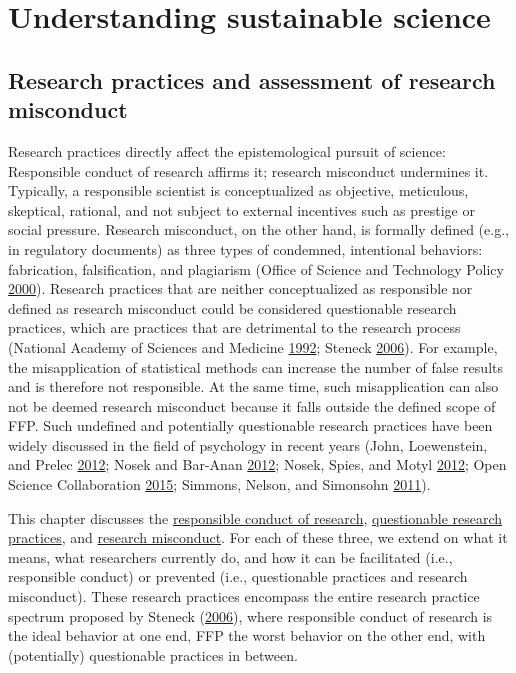 \documentclass[a5paper]{book}
\begin{document}
\part{Understanding sustainable
science}\label{part-understanding-sustainable-science}

\chapter{Research practices and assessment of research
misconduct}\label{research-practices-and-assessment-of-research-misconduct}

Research practices directly affect the epistemological pursuit of
science: Responsible conduct of research affirms it; research misconduct
undermines it. Typically, a responsible scientist is conceptualized as
objective, meticulous, skeptical, rational, and not subject to external
incentives such as prestige or social pressure. Research misconduct, on
the other hand, is formally defined (e.g., in regulatory documents) as
three types of condemned, intentional behaviors: fabrication,
falsification, and plagiarism (Office of Science and Technology Policy
\protect\hyperlink{ref-ostp2000}{2000}). Research practices that are
neither conceptualized as responsible nor defined as research misconduct
could be considered questionable research practices, which are practices
that are detrimental to the research process (National Academy of
Sciences and Medicine
\protect\hyperlink{ref-doi:10.17226ux2f1864}{1992}; Steneck
\protect\hyperlink{ref-doi:10.1007ux2fpl00022268}{2006}). For example,
the misapplication of statistical methods can increase the number of
false results and is therefore not responsible. At the same time, such
misapplication can also not be deemed research misconduct because it
falls outside the defined scope of FFP. Such undefined and potentially
questionable research practices have been widely discussed in the field
of psychology in recent years (John, Loewenstein, and Prelec
\protect\hyperlink{ref-doi:10.1177ux2f0956797611430953}{2012}; Nosek and
Bar-Anan
\protect\hyperlink{ref-doi:10.1080ux2f1047840X.2012.692215}{2012};
Nosek, Spies, and Motyl
\protect\hyperlink{ref-doi:10.1177ux2f1745691612459058}{2012}; Open
Science Collaboration
\protect\hyperlink{ref-doi:10.1126ux2fscience.aac4716}{2015}; Simmons,
Nelson, and Simonsohn
\protect\hyperlink{ref-doi:10.1177ux2f0956797611417632}{2011}).

This chapter discusses the
\protect\hyperlink{responsible-conduct-of-research}{responsible conduct
of research},
\protect\hyperlink{questionable-research-practices}{questionable
research practices}, and
\protect\hyperlink{research-misconduct}{research misconduct}. For each
of these three, we extend on what it means, what researchers currently
do, and how it can be facilitated (i.e., responsible conduct) or
prevented (i.e., questionable practices and research misconduct). These
research practices encompass the entire research practice spectrum
proposed by Steneck
(\protect\hyperlink{ref-doi:10.1007ux2fpl00022268}{2006}), where
responsible conduct of research is the ideal behavior at one end, FFP
the worst behavior on the other end, with (potentially) questionable
practices in between.
\end{document}
